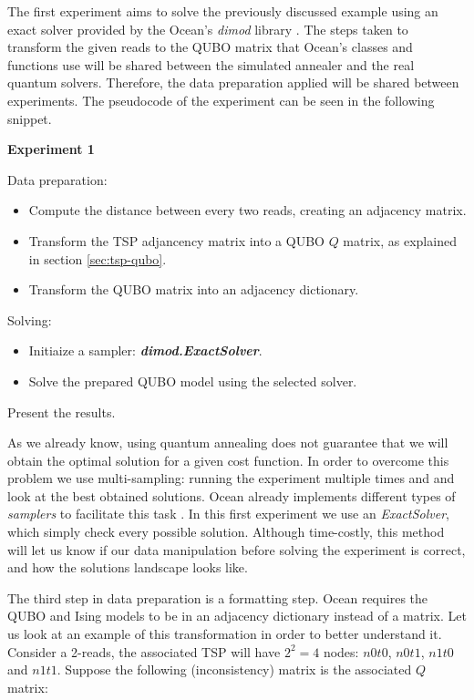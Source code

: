 The first experiment aims to solve the previously discussed example using an exact solver provided by the Ocean's \emph{dimod} library \cite{Dimod}. The steps taken to transform the given reads to the QUBO matrix that Ocean's classes and functions use will be shared between the simulated annealer and the real quantum solvers. Therefore, the data preparation applied will be shared between experiments. The pseudocode of the experiment can be seen in the following snippet.

\begin{algorithm}
	\caption*{\textbf{Experiment 1}}
	
	Data preparation:
	\begin{itemize}
		\item Compute the distance between every two reads, creating an adjacency matrix.
		\item Transform the TSP adjancency matrix into a QUBO $Q$ matrix, as explained in section \ref{sec:tsp-qubo}.
		\item Transform the QUBO matrix into an adjacency dictionary.
	\end{itemize}

	Solving:
	\begin{itemize}
		\item Initiaize a sampler: \textbf{\emph{dimod.ExactSolver}}.
		\item Solve the prepared QUBO model using the selected solver.
	\end{itemize}
	
	Present the results.
\end{algorithm}

As we already know, using quantum annealing does not guarantee that we will obtain the optimal solution for a given cost function. In order to overcome this problem we use multi-sampling: running the experiment multiple times and and look at the best obtained solutions. Ocean already implements different types of \emph{samplers} to facilitate this task \cite{DWave-OceanDoc-Samplers}. In this first experiment we use an \emph{ExactSolver}, which simply check every possible solution. Although time-costly, this method will let us know if our data manipulation before solving the experiment is correct, and how the solutions landscape looks like.

The third step in data preparation is a formatting step. Ocean requires the QUBO and Ising models to be in an adjacency dictionary instead of a matrix. Let us look at an example of this transformation in order to better understand it. Consider a 2-reads, the associated TSP will have $2^2 = 4$ nodes: $n0t0$, $n0t1$, $n1t0$ and $n1t1$. Suppose the following (inconsistency) matrix is the associated $Q$ matrix:

